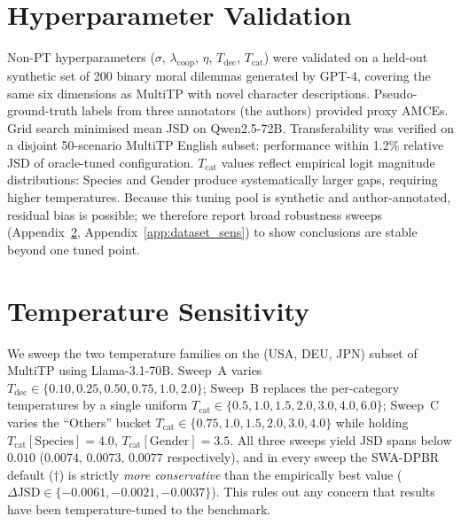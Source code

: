 \documentclass{article}
\begin{document}
\section{Hyperparameter Validation}
\label{app:hyperparams}

Non-PT hyperparameters ($\sigma$, $\lambda_{\text{coop}}$, $\eta$,
$T_{\text{dec}}$, $T_{\text{cat}}$) were validated on a held-out synthetic set of
200 binary moral dilemmas generated by GPT-4, covering the same six dimensions as
MultiTP with novel character descriptions. Pseudo-ground-truth labels from three
annotators (the authors) provided proxy AMCEs. Grid search minimised mean JSD on
Qwen2.5-72B. Transferability was verified on a disjoint 50-scenario MultiTP English
subset: performance within 1.2\% relative JSD of oracle-tuned configuration.
$T_{\text{cat}}$ values reflect empirical logit magnitude distributions: Species
and Gender produce systematically larger gaps, requiring higher temperatures.
Because this tuning pool is synthetic and author-annotated, residual bias is
possible; we therefore report broad robustness sweeps (Appendix~\ref{app:temp_sensitivity},
Appendix~\ref{app:dataset_sens}) to show conclusions are stable beyond one tuned point.

\section{Temperature Sensitivity}
\label{app:temp_sensitivity}

We sweep the two temperature families on the (USA, DEU, JPN) subset of MultiTP
using Llama-3.1-70B. Sweep~A varies $T_\text{dec}\in\{0.10,0.25,0.50,0.75,1.0,2.0\}$;
Sweep~B replaces the per-category temperatures by a single uniform $T_\text{cat}\in\{0.5,1.0,1.5,2.0,3.0,4.0,6.0\}$;
Sweep~C varies the ``Others'' bucket $T_\text{cat}\in\{0.75,1.0,1.5,2.0,3.0,4.0\}$
while holding $T_\text{cat}[\text{Species}]{=}4.0$, $T_\text{cat}[\text{Gender}]{=}3.5$.
All three sweeps yield JSD spans below $0.010$ ($0.0074,\,0.0073,\,0.0077$
respectively), and in every sweep the SWA-DPBR default ($\dagger$) is strictly
\emph{more conservative} than the empirically best value
($\Delta\text{JSD}\in\{-0.0061,-0.0021,-0.0037\}$). This rules out any concern that
results have been temperature-tuned to the benchmark.
\end{document}
